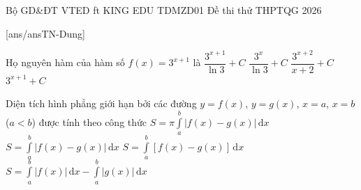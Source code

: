 \def\linkdethi{} %
\anmaQR
\def\toanlop{12}
\def\thoigian{90}
\def\namhoc{2025 - 2026}
\begin{dethi}
	{Bộ GD\&ĐT}
	{VTED ft KING EDU}
	{TDMZD01}
	{Đề thi thử THPTQG 2026}
\end{dethi}

\caulc
{}[ans/ansTN-Dung]
\begin{ex}%
	Họ nguyên hàm của hàm số $f(x)=3^{x+1}$ là
	\choice
	{\True $\dfrac{3^{x+1}}{\ln 3}+C$}
	{$\dfrac{3^{x}}{\ln 3}+C$}
	{$\dfrac{3^{x+2}}{x+2}+C$}
	{$3^{x+1}+C$}
\end{ex}

\begin{ex}%
	Diện tích hình phẳng giới hạn bởi các đường $y=f(x)$, $y=g(x)$, $x=a$, $x=b$ ($a<b$) được tính theo công thức
	\choice
	{$S=\pi\displaystyle\int\limits_{a}^{b}\left|f(x)-g(x)\right|\,\mathrm{d}x$}
	{\True $S=\displaystyle\int\limits_{a}^{b}\left|f(x)-g(x)\right|\,\mathrm{d}x$}
	{$S=\displaystyle\int\limits_{a}^{b}\left[f(x)-g(x)\right]\,\mathrm{d}x$}
	{$S=\displaystyle\int\limits_{a}^{b}\left|f(x)\right|\,\mathrm{d}x-\displaystyle\int\limits_{a}^{b}\left|g(x)\right|\,\mathrm{d}x$}
\end{ex}

